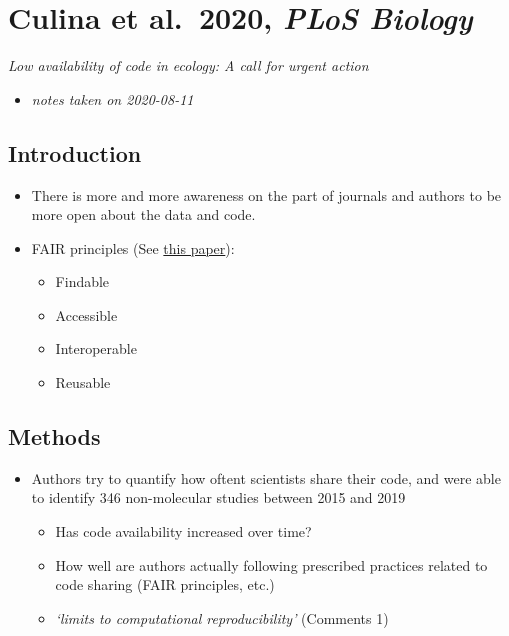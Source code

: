 \documentclass[
]{book}
\providecommand{\tightlist}{%
  \setlength{\itemsep}{0pt}\setlength{\parskip}{0pt}}
\begin{document}
\hypertarget{culina-et-al.-2020-plos-biology}{%
\chapter{\texorpdfstring{Culina et al.~2020, \emph{PLoS Biology}}{Culina et al.~2020, PLoS Biology}}\label{culina-et-al.-2020-plos-biology}}


\emph{Low availability of code in ecology: A call for urgent action} \citep{culina2020low}

\begin{itemize}
\tightlist
\item
  \emph{notes taken on 2020-08-11}
\end{itemize}

\hypertarget{introduction-10}{%
\section{Introduction}\label{introduction-10}}

\begin{itemize}
\tightlist
\item
  There is more and more awareness on the part of journals and authors to be more open about the data and code.
\item
  FAIR principles (See \href{https://www.nature.com/articles/sdata201618}{this paper}):

  \begin{itemize}
  \tightlist
  \item
    Findable
  \item
    Accessible
  \item
    Interoperable
  \item
    Reusable
  \end{itemize}
\end{itemize}

\hypertarget{methods-10}{%
\section{Methods}\label{methods-10}}

\begin{itemize}
\tightlist
\item
  Authors try to quantify how oftent scientists share their code, and were able to identify 346 non-molecular studies between 2015 and 2019

  \begin{itemize}
  \tightlist
  \item
    Has code availability increased over time?
  \item
    How well are authors actually following prescribed practices related to code sharing (FAIR principles, etc.)
  \item
    \emph{`limits to computational reproducibility'} (\protect\hypertarget{comments_culina}{}{Comments 1})
  \end{itemize}
\end{itemize}
\end{document}
